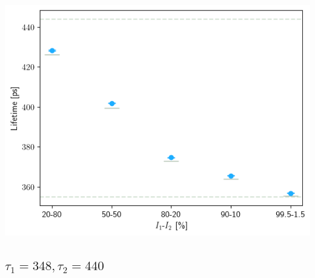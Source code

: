 \begin{minipage}{\linewidth}
     
    \includegraphics[width= .47\linewidth]{Batch 7/355-444/output/1 life/lifetime.png}
    \label{fig:355-444-1life}
\end{minipage}

\vfill
\subsection{\boldmath$\tau_1=348, \tau_2=440$\unboldmath\label{3lifefits}}



